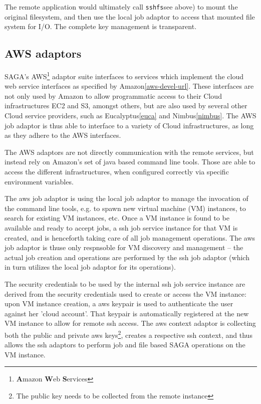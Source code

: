 \documentclass[conference,final]{IEEEtran}
\newcommand{\B}[1]{\textbf{#1}}
\newcommand{\sshfs}[1]{\texttt{sshfs}}
\begin{document}
   The remote application would ultimately call \sshfs (see above) to
   mount the original filesystem, and then use the local job adaptor
   to access that mounted file system for I/O.  The complete key
   management is transparent.


 
 \subsection{AWS adaptors}

  SAGA's AWS\footnote{\B{A}mazon \B{W}eb \B{S}ervices} adaptor suite
  interfaces to services which implement the cloud web service
  interfaces as specified by Amazon\ref{aws-devel-url}.  These
  interfaces are not only used by Amazon to allow programmatic access
  to their Cloud infrastructures EC2 and S3, amongst others, but are
  also used by several other Cloud service providers, such as
  Eucalyptus\ref{euca} and Nimbus\ref{nimbus}.  The AWS job adaptor is
  thus able to interface to a variety of Cloud infrastructures, as
  long as they adhere to the AWS interfaces.

  The AWS adaptors are not directly communication with the remote
  services, but instead rely on Amazon's set of java based command
  line tools.  Those are able to access the different infrastructures,
  when configured correctly via specific environment variables.

  The aws job adaptor is using the local job adaptor to manage the
  invocation of the command line tools, e.g. to spawn new virtual
  machine (VM) instances, to search for existing VM instances, etc.
  Once a VM instance is found to be available and ready to accept
  jobs, a ssh job service instance for that VM is created, and is
  henceforth taking care of all job management operations.  The aws
  job adaptor is thuse only respnsoble for VM discovery and management
  -- the actual job creation and operations are performed by the ssh
  job adaptor (which in turn utilizes the local job adaptor for its
  operations).

  The security credentials to be used by the internal ssh job service
  instance are derived from the security credentials used to create or
  access the VM instance: upon VM instance creation, a aws keypair is
  used to authenticate the user against her 'cloud account'.  That
  keypair is automatically registered at the new VM instance to allow
  for remote ssh access.  The aws context adaptor is collecting both
  the public and private aws keys\footnote{The public key needs to be
  collected from the remote instance}, creates a respective ssh context,
  and thus allows the ssh adaptors to perform job and file based SAGA
  operations on the VM instance.
\end{document}
